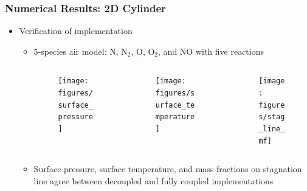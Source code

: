 \documentclass{beamer}
\begin{document}
\begin{frame}
  \frametitle{Numerical Results: 2D Cylinder}
  \begin{itemize}
    \item Verification of implementation
    \begin{itemize}
      \item 5-species air model: N, $\text{N}_2$, O, $\text{O}_2$, and NO with five reactions
      \begin{columns}[t]
        \begin{column}{0.33\textwidth}
          \begin{figure}[h!]
            \texttt{[image: figures/surface\_pressure]}
          \end{figure}
        \end{column}
        \begin{column}{0.33\textwidth}
          \begin{figure}[h!]
            \texttt{[image: figures/surface\_temperature]}
          \end{figure}
        \end{column}
        \begin{column}{0.33\textwidth}
          \begin{figure}[h!]
            \texttt{[image: figures/stag\_line\_mf]}
          \end{figure}
        \end{column}
      \end{columns}
      \vspace{3mm}
      \item Surface pressure, surface temperature, and mass fractions on
        stagnation line agree between decoupled and fully coupled
        implementations
    \end{itemize}
  \end{itemize}
\end{frame}
\end{document}
